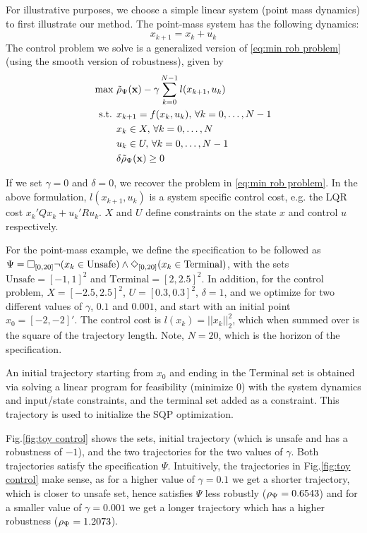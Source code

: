 For illustrative purposes, we choose a simple linear system (point mass dynamics) to first illustrate our method. The point-mass system has the following dynamics:
\begin{equation}
\label{eq:PointMass}
x_{k+1} = x_k + u_k
\end{equation}
The control problem we solve is a generalized version of \eqref{eq:min rob problem} (using the smooth version of robustness), given by
\begin{subequations}
\label{eq:general_ctrl}
\begin{align}
\text{max } & \tilde{\rho}_{\Psi}(\mathbf{x}) - \gamma \sum_{k=0}^{N-1} l(x_{k+1},u_{k}) \\
\text{s.t. } & x_{k+1} = f(x_k,u_k), \, \forall k=0,\dotsc,N-1 \\
 & x_k \in X, \, \forall k=0,\dotsc,N \\
 & u_k \in U, \, \forall k=0,\dotsc,N-1 \\
 & \delta \tilde{\rho}_{\Psi}(\mathbf{x}) \geq 0
\end{align}
\end{subequations}

If we set $\gamma=0$ and $\delta=0$, we recover the problem in \eqref{eq:min rob problem}. In the above formulation, $l(x_{k+1},u_{k})$ is a system specific control cost, e.g. the LQR cost $x_k'Qx_k + u_k'Ru_k$. $X$ and $U$ define constraints on the state $x$ and control $u$ respectively. 

For the point-mass example, we define the specification to be followed as $\Psi = \square_{[0,20]} \neg (x_k \in \text{Unsafe}) \wedge \Diamond_{[0,20]} (x_k \in \text{Terminal})$, with the sets $\text{Unsafe}=[-1,1]^2$ and $\text{Terminal}=[2,2.5]^2$. In addition, for the control problem, $X=[-2.5,2.5]^2$, $U=[0.3,0.3]^2$, $\delta=1$, and we optimize for two different values of $\gamma$, $0.1$ and $0.001$, and start with an initial point $x_0=[-2,-2]'$. The control cost is $l(x_k) = ||x_k||_{2}^2$, which when summed over is the square of the trajectory length. Note, $N=20$, which is the horizon of the specification.

An initial trajectory starting from $x_0$ and ending in the $\text{Terminal}$ set is obtained via solving a linear program for feasibility ($\text{minimize } 0$) with the system dynamics and input/state constraints, and the terminal set added as a constraint. This trajectory is used to initialize the SQP optimization.

Fig.\ref{fig:toy control} shows the sets, initial trajectory (which is unsafe and has a robustness of $-1$), and the two trajectories for the two values of $\gamma$. Both trajectories satisfy the specification $\Psi$. Intuitively, the trajectories in Fig.\ref{fig:toy control} make sense, as for a higher value of $\gamma=0.1$ we get a shorter trajectory, which is closer to unsafe set, hence satisfies $\Psi$ less robustly ($\rho_{\Psi}=0.6543$) and for a smaller value of $\gamma=0.001$ we get a longer trajectory which has a higher robustness ($\rho_{\Psi}=1.2073$).

